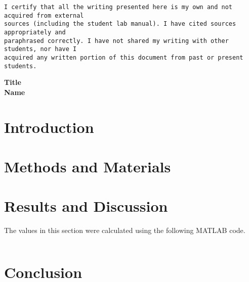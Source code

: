 \documentclass [12pt,fleqn] {article}
\begin{document}
\begin{Verbatim}[baselinestretch=1.00] 
I certify that all the writing presented here is my own and not acquired from external 
sources (including the student lab manual). I have cited sources appropriately and 
paraphrased correctly. I have not shared my writing with other students, nor have I 
acquired any written portion of this document from past or present students.
\end{Verbatim}
\begin{center}
	\huge{\textbf{Title}} \\
	\large{\textbf{Name}} \vspace{-5mm}
\end{center}
\section{Introduction} \vspace{-5mm}
\restoregeometry
\section{Methods and Materials}
\section{Results and Discussion} \vspace{-3mm}
\par The values in this section were calculated using the following MATLAB code. 
	\scriptsize\begin{Verbatim}[baselinestretch=1.00]
	\end{Verbatim}
\normalsize \vspace{-10mm}
\section{Conclusion} 
\newpage
\renewcommand{\refname}{\normalfont\selectfont\normalsize \textbf{References}} 
\begin{thebibliography}{3}
\end{thebibliography}
\end{document}
